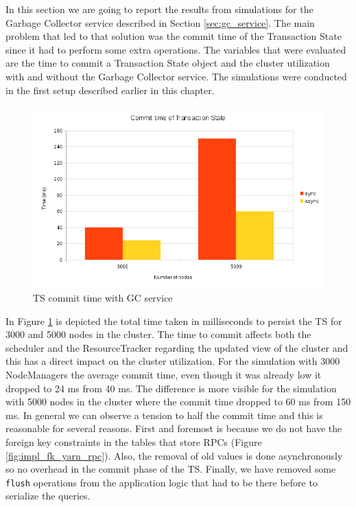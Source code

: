 In this section we are going to report the results from simulations
for the Garbage Collector service described in Section
\ref{sec:gc_service}. The main problem that led to that solution was
the commit time of the Transaction State since it had to perform some
extra operations. The variables that were evaluated are the time to
commit a Transaction State object and the cluster utilization with and
without the Garbage Collector service. The simulations were conducted
in the first setup described earlier in this chapter.

\begin{figure}
\centering
\includegraphics[scale=0.7]{resources/images/Evaluation/ts_commit_sync_async.png}
\caption{TS commit time with GC service}
\label{fig:ev_ts_sync_async}
\end{figure}

In Figure \ref{fig:ev_ts_sync_async} is depicted the total time taken
in milliseconds to persist the TS for 3000 and 5000 nodes in the
cluster. The time to commit affects both the scheduler and the
ResourceTracker regarding the updated view of the cluster and this has
a direct impact on the cluster utilization. For the simulation with
3000 NodeManagers the average commit time, even though it was already
low it dropped to 24 ms from 40 ms. The difference is more visible
for the simulation with 5000 nodes in the cluster where the commit
time dropped to 60 ms from 150 ms. In general we can observe a tension
to half the commit time and this is reasonable for several
reasons. First and foremost is because we do not have the foreign key
constraints in the tables that store RPCs (Figure
\ref{fig:impl_fk_yarn_rpc}). Also, the removal of old values is done
asynchronously so no overhead in the commit phase of the TS. Finally,
we have removed some \texttt{flush} operations from the application
logic that had to be there before to serialize the queries.


